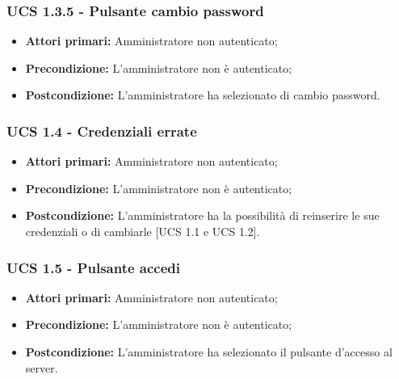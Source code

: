 \subsubsection{UCS 1.3.5 - Pulsante cambio password}%
\begin{itemize}
\item \textbf{Attori primari:} Amministratore non autenticato;
\item \textbf{Precondizione:} L'amministratore non è autenticato;
\item \textbf{Postcondizione:} L'amministratore ha selezionato di cambio password.
\end{itemize}

\subsubsection{UCS 1.4 - Credenziali errate}%
\begin{itemize}
\item \textbf{Attori primari:} Amministratore non autenticato;
\item \textbf{Precondizione:} L'amministratore non è autenticato;
\item \textbf{Postcondizione:} L'amministratore ha la possibilità di reinserire le sue credenziali o di cambiarle [UCS 1.1 e UCS 1.2].
\end{itemize}

\subsubsection{UCS 1.5 - Pulsante accedi}%
\begin{itemize}
\item \textbf{Attori primari:} Amministratore non autenticato;
\item \textbf{Precondizione:} L'amministratore non è autenticato;
\item \textbf{Postcondizione:} L'amministratore ha selezionato il pulsante d'accesso al server.
\end{itemize}
